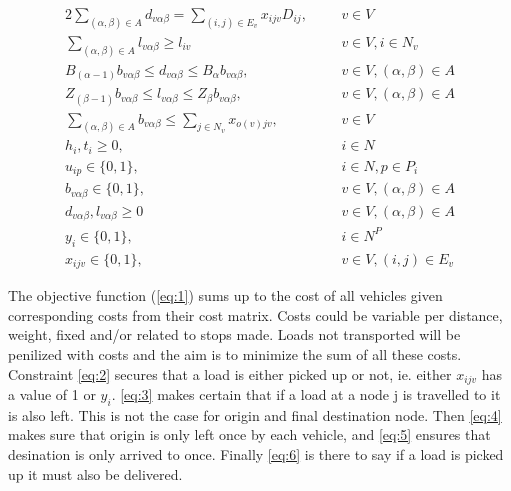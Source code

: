 \documentclass[a4paper,10pt]{article}
\begin{document}
\begin{alignat} {2}
    \sum_{(\alpha,\beta)\in A}d_{v\alpha\beta} = 
    \sum_{(i,j) \in E_v} x_{ijv}D_{ij},					& 	&&	v \in V						\label{eq:18}	\\[4pt]
    \sum_{(\alpha,\beta) \in A} l_{v\alpha\beta} \geq l_{iv}		&	&& 	v \in V, i \in N_v				\label{eq:19}	\\[4pt]
    B_{(\alpha-1)}b_{v\alpha\beta} \leq d_{v\alpha\beta} \leq 
    B_\alpha b_{v\alpha\beta},				        	& 	&&	v \in V, (\alpha, \beta) \in A			\label{eq:20}	\\[8pt]
    Z_{(\beta-1)}b_{v\alpha\beta} \leq l_{v\alpha\beta} \leq 
    Z_\beta b_{v\alpha\beta},				        	& 	&&	v \in V, (\alpha, \beta) \in A 			\label{eq:21}	\\[8pt]   	
    \sum_{(\alpha, \beta) \in A} b_{v\alpha\beta} \leq		
    \sum_{j\in N_v}x_{o(v)jv},                                          & 	&&	v \in V						\label{eq:22}	\\[4pt]
    h_i, t_i \geq 0,							& 	&&	i \in N 					\label{eq:23}	\\[8pt]
    u_{ip} \in \{0, 1\},						& 	&&	i \in N, p \in P_i 				\label{eq:24}	\\[8pt]
    b_{v\alpha\beta} \in \{0, 1\},					& 	&&	v \in V, (\alpha,\beta) \in A 			\label{eq:25}	\\[8pt]
    d_{v\alpha\beta}, l_{v\alpha\beta} \geq 0                           &       &&      v \in V, (\alpha,\beta) \in A 			\label{eq:26}	\\[8pt]
    y_i \in \{0, 1\},						        & 	&&	i \in N^P 					\label{eq:27}	\\[8pt]
    x_{ijv} \in \{0, 1\},						&	&&	v \in V, (i, j) \in E_v 			\label{eq:28}
\end{alignat} 
\endgroup

\par
The objective function (\ref{eq:1}) sums up to the cost of all vehicles given corresponding costs from their cost matrix. Costs could be variable per distance, weight, fixed and/or related to stops made. Loads not transported will be penilized with costs and the aim is to minimize the sum of all these costs.
Constraint \ref{eq:2} secures that a load is either picked up or not, ie. either $x_{ijv}$ has a value of 1 or $y_i$.
\ref{eq:3} makes certain that if a load at a node j is travelled to it is also left. This is not the case for origin and final destination node.
Then \ref{eq:4} makes sure that origin is only left once by each vehicle, 
and \ref{eq:5} ensures that desination is only arrived to once.
Finally \ref{eq:6} is there to say if a load is picked up it must also be delivered. \par
\end{document}

